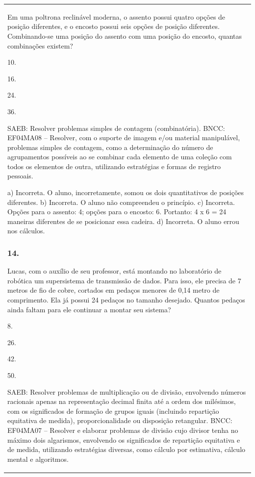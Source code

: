 \begin{mdframed}[linewidth=2pt,linecolor=salmao,roundcorner=2pt]
\begin{escolha}
{{{\begin{longtable}[]{@{}l@{}}
\begin{itemize}
{Em uma poltrona reclinável moderna, o assento possui quatro opções de posição
diferentes, e o encosto possui seis opções de posição diferentes. Combinando-se uma posição do assento com uma posição do encosto, quantas combinações existem?

\begin{escolha}
\item
  10.
\item
  16.
\item
  24.
\item
  36.
\end{escolha}

SAEB: Resolver problemas simples de contagem (combinatória).
BNCC: EF04MA08 -- Resolver, com o suporte de imagem e/ou material manipulável, problemas simples
de contagem, como a determinação do número de agrupamentos possíveis ao se combinar cada
elemento de uma coleção com todos os elementos de outra, utilizando estratégias e formas de
registro pessoais.

a) Incorreta. O aluno, incorretamente, somou os dois quantitativos de posições diferentes.
b) Incorreta. O aluno não compreendeu o princípio.
c) Incorreta. Opções para o assento: 4; opções para o encosto: 6. Portanto: 4 x 6 = 24 maneiras diferentes de se posicionar essa cadeira.
d) Incorreta. O aluno errou nos cálculos.

\subsubsection{14.}

Lucas, com o auxílio de seu professor, está montando no laboratório de
robótica um supersistema de transmissão de dados. Para isso, ele
precisa de 7 metros de fio de cobre, cortados em pedaços menores de 0,14
metro de comprimento. Ela já possui 24 pedaços no tamanho desejado. Quantos pedaços ainda
faltam para ele continuar a montar seu sistema?

\begin{escolha}
\item
  8.
\item
  26.
\item
  42.
\item
  50.
\end{escolha}

SAEB: Resolver problemas de multiplicação ou de divisão,
envolvendo números racionais apenas na representação decimal finita até
a ordem dos milésimos, com os significados de formação de grupos iguais
(incluindo repartição equitativa de medida), proporcionalidade ou
disposição retangular.
BNCC: EF04MA07 -- Resolver e elaborar problemas de divisão cujo divisor tenha no máximo dois algarismos,
envolvendo os significados de repartição equitativa e de medida, utilizando estratégias diversas,
como cálculo por estimativa, cálculo mental e algoritmos.

}
\end{itemize}
\end{longtable}}}}
\end{escolha}
\end{mdframed}
